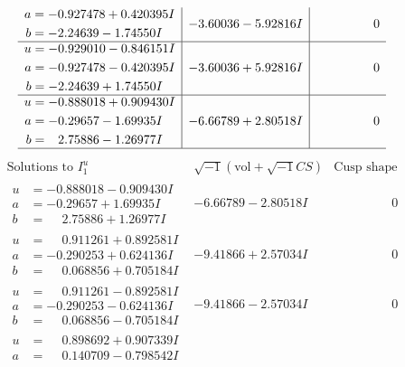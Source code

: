 \documentclass[1p]{elsarticle_modified}
\theoremstyle{definition}
\newcommand{\I}{\sqrt{-1}}
\begin{document}
$$\begin{array}{c|c|c}
\begin{aligned}
a &= -0.927478 + 0.420395 I \\
b &= -2.24639 - 1.74550 I\end{aligned}
 & -3.60036 - 5.92816 I & \phantom{-0.000000 } 0 \\ \hline\begin{aligned}
u &= -0.929010 - 0.846151 I \\
a &= -0.927478 - 0.420395 I \\
b &= -2.24639 + 1.74550 I\end{aligned}
 & -3.60036 + 5.92816 I & \phantom{-0.000000 } 0 \\ \hline\begin{aligned}
u &= -0.888018 + 0.909430 I \\
a &= -0.29657 - 1.69935 I \\
b &= \phantom{-}2.75886 - 1.26977 I\end{aligned}
 & -6.66789 + 2.80518 I & \phantom{-0.000000 } 0\\
 \hline 
 \end{array}$$\newpage$$\begin{array}{c|c|c}  
\text{Solutions to }I^u_{1}& \I (\text{vol} + \sqrt{-1}CS) & \text{Cusp shape}\\
 \hline 
\begin{aligned}
u &= -0.888018 - 0.909430 I \\
a &= -0.29657 + 1.69935 I \\
b &= \phantom{-}2.75886 + 1.26977 I\end{aligned}
 & -6.66789 - 2.80518 I & \phantom{-0.000000 } 0 \\ \hline\begin{aligned}
u &= \phantom{-}0.911261 + 0.892581 I \\
a &= -0.290253 + 0.624136 I \\
b &= \phantom{-}0.068856 + 0.705184 I\end{aligned}
 & -9.41866 + 2.57034 I & \phantom{-0.000000 } 0 \\ \hline\begin{aligned}
u &= \phantom{-}0.911261 - 0.892581 I \\
a &= -0.290253 - 0.624136 I \\
b &= \phantom{-}0.068856 - 0.705184 I\end{aligned}
 & -9.41866 - 2.57034 I & \phantom{-0.000000 } 0 \\ \hline\begin{aligned}
u &= \phantom{-}0.898692 + 0.907339 I \\
a &= \phantom{-}0.140709 - 0.798542 I \\

\end{aligned}
\end{array}$$
\end{document}
